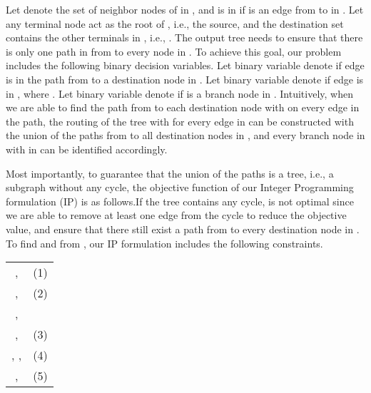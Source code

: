 \documentclass[conference]{IEEEtran}
\begin{document}
Let  denote the set of neighbor nodes of  in , and  is in  if  is an edge from  to  in . Let any terminal node  act as the
root of , i.e., the source, and the destination set  contains the other terminals in , i.e., . The output tree  needs to ensure that there is
only one path in  from  to every node in . To achieve this goal,
our problem includes the following binary decision variables. Let binary
variable  denote if edge  is in the path from  to a destination node  in . Let binary variable 
denote if edge  is in , where . Let binary variable  denote if  is a branch node in . Intuitively, when we are able to find the path from  to each destination
node  with  on every edge  in the path, the
routing of the tree with  for every edge  in  can be constructed with the union of the paths from  to all destination
nodes in , and every branch node  in  with  in 
can be identified accordingly.

Most importantly, to guarantee that the union of the paths is a tree, i.e.,
a subgraph without any cycle, the objective function of our Integer
Programming formulation (IP) is as follows.If the tree  contains any cycle,  is not optimal since we are able to
remove at least one edge from the cycle to reduce the objective value, and
ensure that there still exist a path from  to every destination node  in .
To find  and  from , our IP
formulation includes the following constraints.

\begin{center}
\begin{tabular}{cc}
,  & (1)\\
\vspace{2pt}
,  & (2)\\
\vspace{2pt}
, \\ ,  & (3)\\
\vspace{2pt}
, ,  & (4)\\
\vspace{2pt}
,  & (5)\end{tabular}
\end{center}
\end{document}
